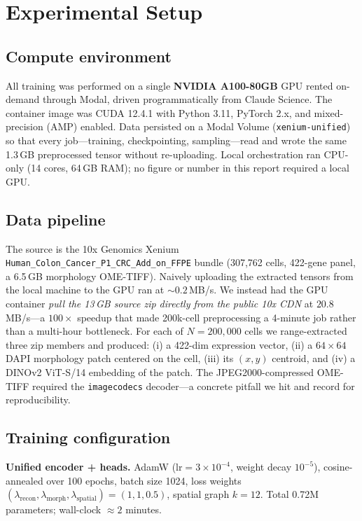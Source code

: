 \documentclass[10pt,twocolumn]{article}
\begin{document}
\section{Experimental Setup}
\subsection{Compute environment}
All training was performed on a single \textbf{NVIDIA A100-80GB} GPU rented
on-demand through Modal, driven programmatically from Claude Science. The
container image was CUDA 12.4.1 with Python 3.11, PyTorch 2.x, and
mixed-precision (AMP) enabled. Data persisted on a Modal Volume
(\texttt{xenium-unified}) so that every job---training, checkpointing,
sampling---read and wrote the same 1.3\,GB preprocessed tensor without
re-uploading. Local orchestration ran CPU-only (14 cores, 64\,GB RAM); no
figure or number in this report required a local GPU.

\subsection{Data pipeline}
The source is the 10x Genomics Xenium
\texttt{Human\_Colon\_Cancer\_P1\_CRC\_Add\_on\_FFPE} bundle (307{,}762 cells,
422-gene panel, a 6.5\,GB morphology OME-TIFF). Naively uploading the extracted
tensors from the local machine to the GPU ran at $\sim0.2$\,MB/s. We instead had
the GPU container \emph{pull the 13\,GB source zip directly from the public 10x
CDN} at $20.8$\,MB/s---a $100\times$ speedup that made 200k-cell preprocessing a
4-minute job rather than a multi-hour bottleneck. For each of $N{=}200{,}000$
cells we range-extracted three zip members and produced: (i) a 422-dim
expression vector, (ii) a $64{\times}64$ DAPI morphology patch centered on the
cell, (iii) its $(x,y)$ centroid, and (iv) a DINOv2 ViT-S/14 embedding of the
patch. The JPEG2000-compressed OME-TIFF required the \texttt{imagecodecs}
decoder---a concrete pitfall we hit and record for reproducibility.

\subsection{Training configuration}
\textbf{Unified encoder + heads.} AdamW ($\text{lr}{=}3\!\times\!10^{-4}$,
weight decay $10^{-5}$), cosine-annealed over 100 epochs, batch size 1024, loss
weights $(\lambda_{\text{recon}},\lambda_{\text{morph}},\lambda_{\text{spatial}})
=(1,1,0.5)$, spatial graph $k{=}12$. Total 0.72M parameters; wall-clock
$\approx2$ minutes.
\end{document}
